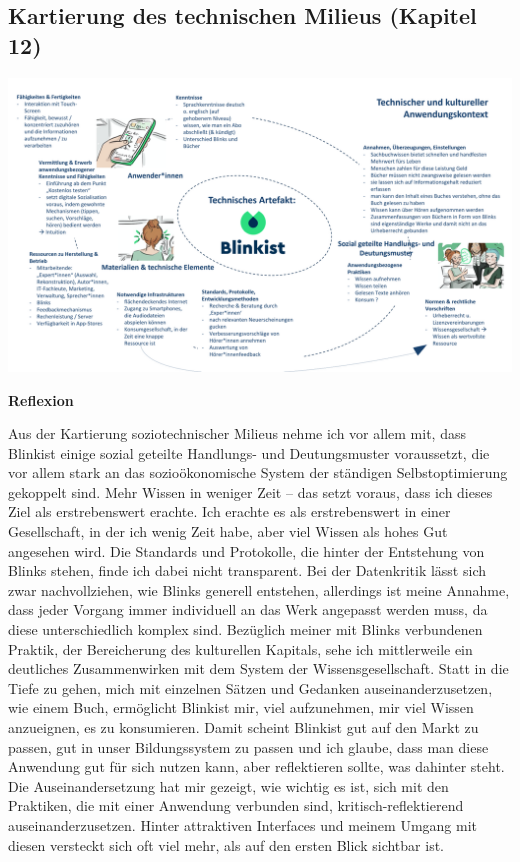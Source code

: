\documentclass[
  a4paper,
]{book}
\begin{document}
\subsection*{Kartierung des technischen Milieus (Kapitel 12)}\label{kartierung-des-technischen-milieus-kapitel-12}

\begin{center}\includegraphics{Figures/12-Bsp.1} \end{center}

\textbf{Reflexion}

Aus der Kartierung soziotechnischer Milieus nehme ich vor allem mit, dass Blinkist einige sozial geteilte Handlungs- und Deutungsmuster voraussetzt, die vor allem stark an das sozioökonomische System der ständigen Selbstoptimierung gekoppelt sind. Mehr Wissen in weniger Zeit -- das setzt voraus, dass ich dieses Ziel als erstrebenswert erachte. Ich erachte es als erstrebenswert in einer Gesellschaft, in der ich wenig Zeit habe, aber viel Wissen als hohes Gut angesehen wird. Die Standards und Protokolle, die hinter der Entstehung von Blinks stehen, finde ich dabei nicht transparent. Bei der Datenkritik lässt sich zwar nachvollziehen, wie Blinks generell entstehen, allerdings ist meine Annahme, dass jeder Vorgang immer individuell an das Werk angepasst werden muss, da diese unterschiedlich komplex sind. Bezüglich meiner mit Blinks verbundenen Praktik, der Bereicherung des kulturellen Kapitals, sehe ich mittlerweile ein deutliches Zusammenwirken mit dem System der Wissensgesellschaft. Statt in die Tiefe zu gehen, mich mit einzelnen Sätzen und Gedanken auseinanderzusetzen, wie einem Buch, ermöglicht Blinkist mir, viel aufzunehmen, mir viel Wissen anzueignen, es zu konsumieren. Damit scheint Blinkist gut auf den Markt zu passen, gut in unser Bildungssystem zu passen und ich glaube, dass man diese Anwendung gut für sich nutzen kann, aber reflektieren sollte, was dahinter steht. Die Auseinandersetzung hat mir gezeigt, wie wichtig es ist, sich mit den Praktiken, die mit einer Anwendung verbunden sind, kritisch-reflektierend auseinanderzusetzen. Hinter attraktiven Interfaces und meinem Umgang mit diesen versteckt sich oft viel mehr, als auf den ersten Blick sichtbar ist.
\end{document}
